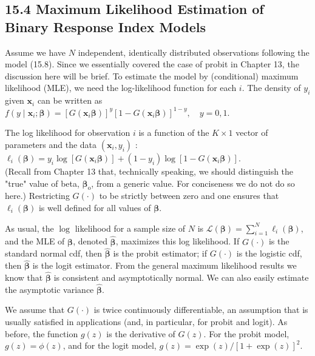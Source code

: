 \documentclass[10pt]{article}
\begin{document}
\subsection*{15.4 Maximum Likelihood Estimation of Binary Response Index Models}
Assume we have $N$ independent, identically distributed observations following the model (15.8). Since we essentially covered the case of probit in Chapter 13, the\\
discussion here will be brief. To estimate the model by (conditional) maximum likelihood (MLE), we need the log-likelihood function for each $i$. The density of $y_{i}$ given $\mathbf{x}_{i}$ can be written as\\
$f\left(y \mid \mathbf{x}_{i} ; \boldsymbol{\beta}\right)=\left[G\left(\mathbf{x}_{i} \boldsymbol{\beta}\right)\right]^{y}\left[1-G\left(\mathbf{x}_{i} \boldsymbol{\beta}\right)\right]^{1-y}, \quad y=0,1$.

The log likelihood for observation $i$ is a function of the $K \times 1$ vector of parameters and the data $\left(\mathbf{x}_{i}, y_{i}\right)$ :\\
$\ell_{i}(\boldsymbol{\beta})=y_{i} \log \left[G\left(\mathbf{x}_{i} \boldsymbol{\beta}\right)\right]+\left(1-y_{i}\right) \log \left[1-G\left(\mathbf{x}_{i} \boldsymbol{\beta}\right)\right]$.\\
(Recall from Chapter 13 that, technically speaking, we should distinguish the "true" value of beta, $\boldsymbol{\beta}_{\mathrm{o}}$, from a generic value. For conciseness we do not do so here.) Restricting $G(\cdot)$ to be strictly between zero and one ensures that $\ell_{i}(\boldsymbol{\beta})$ is well defined for all values of $\boldsymbol{\beta}$.

As usual, the $\log$ likelihood for a sample size of $N$ is $\mathscr{L}(\boldsymbol{\beta})=\sum_{i=1}^{N} \ell_{i}(\boldsymbol{\beta})$, and the MLE of $\boldsymbol{\beta}$, denoted $\hat{\boldsymbol{\beta}}$, maximizes this log likelihood. If $G(\cdot)$ is the standard normal cdf, then $\hat{\boldsymbol{\beta}}$ is the probit estimator; if $G(\cdot)$ is the logistic cdf, then $\hat{\boldsymbol{\beta}}$ is the logit estimator. From the general maximum likelihood results we know that $\hat{\boldsymbol{\beta}}$ is consistent and asymptotically normal. We can also easily estimate the asymptotic variance $\hat{\boldsymbol{\beta}}$.

We assume that $G(\cdot)$ is twice continuously differentiable, an assumption that is usually satisfied in applications (and, in particular, for probit and logit). As before, the function $g(z)$ is the derivative of $G(z)$. For the probit model, $g(z)=\phi(z)$, and for the logit model, $g(z)=\exp (z) /[1+\exp (z)]^{2}$.
\end{document}
